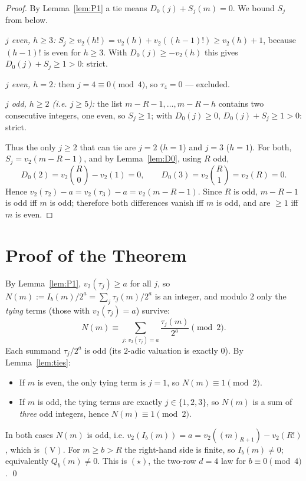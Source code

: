 \documentclass[11pt]{article}
\theoremstyle{definition}
\newcommand{\vtwo}{v_2}
\newcommand{\ff}[2]{(#1)_{#2}}
\begin{document}
\begin{proof}
By Lemma~\ref{lem:P1} a tie means $D_0(j)+S_j(m)=0$. We bound $S_j$ from below.

\emph{$j$ even, $h\ge 3$:} $S_j\ge \vtwo(h!)=\vtwo(h)+\vtwo((h-1)!)\ge\vtwo(h)+1$,
because $(h-1)!$ is even for $h\ge 3$. With $D_0(j)\ge-\vtwo(h)$ this gives
$D_0(j)+S_j\ge 1>0$: strict.

\emph{$j$ even, $h=2$:} then $j=4\equiv 0\pmod 4$, so $\tau_4=0$ --- excluded.

\emph{$j$ odd, $h\ge 2$ (i.e. $j\ge 5$):} the list $m-R-1,\dots,m-R-h$ contains two
consecutive integers, one even, so $S_j\ge 1$; with $D_0(j)\ge0$, $D_0(j)+S_j\ge1>0$:
strict.

Thus the only $j\ge2$ that can tie are $j=2$ ($h=1$) and $j=3$ ($h=1$). For both,
$S_j=\vtwo(m-R-1)$, and by Lemma~\ref{lem:D0}, using $R$ odd,
\[
   D_0(2)=\vtwo\!\binom{R}{0}-\vtwo(1)=0,\qquad
   D_0(3)=\vtwo\!\binom{R}{1}=\vtwo(R)=0 .
\]
Hence $\vtwo(\tau_2)-a=\vtwo(\tau_3)-a=\vtwo(m-R-1)$. Since $R$ is odd, $m-R-1$ is
odd iff $m$ is odd; therefore both differences vanish iff $m$ is odd, and are $\ge1$
iff $m$ is even.
\end{proof}

\section{Proof of the Theorem}

By Lemma~\ref{lem:P1}, $\vtwo(\tau_j)\ge a$ for all $j$, so
$N(m):=I_b(m)/2^{a}=\sum_{j}\tau_j(m)/2^{a}$ is an integer, and modulo $2$ only the
\emph{tying} terms (those with $\vtwo(\tau_j)=a$) survive:
\[
   N(m)\equiv \sum_{j:\,\vtwo(\tau_j)=a}\frac{\tau_j(m)}{2^{a}}\pmod 2 .
\]
Each summand $\tau_j/2^{a}$ is odd (its $2$-adic valuation is exactly $0$). By
Lemma~\ref{lem:ties}:

\begin{itemize}[leftmargin=1.4em]
\item If $m$ is even, the only tying term is $j=1$, so $N(m)\equiv 1\pmod 2$.
\item If $m$ is odd, the tying terms are exactly $j\in\{1,2,3\}$, so $N(m)$ is a sum
of \emph{three} odd integers, hence $N(m)\equiv 1\pmod 2$.
\end{itemize}

In both cases $N(m)$ is odd, i.e. $\vtwo(I_b(m))=a=\vtwo(\ff{m}{R+1})-\vtwo(R!)$,
which is $(\mathrm V)$. For $m\ge b>R$ the right-hand side is finite, so
$I_b(m)\neq0$; equivalently $Q_b(m)\neq0$. This is $(\star)$, the two-row $d=4$ law
for $b\equiv 0\pmod4$. \qed
\end{document}
